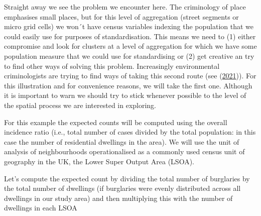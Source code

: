 \documentclass[
  krantz2]{krantz}
\makeatletter
\newenvironment{Shaded}{\begin{snugshade}}{\end{snugshade}}
\newcommand{\AttributeTok}[1]{\textcolor[rgb]{0.61,0.61,0.61}{#1}}
\newcommand{\CommentTok}[1]{\textcolor[rgb]{0.37,0.37,0.37}{\textit{#1}}}
\newcommand{\FunctionTok}[1]{\textcolor[rgb]{0,0,0}{#1}}
\newcommand{\NormalTok}[1]{#1}
\newcommand{\OtherTok}[1]{\textcolor[rgb]{0.37,0.37,0.37}{#1}}
\newcommand{\SpecialCharTok}[1]{\textcolor[rgb]{0,0,0}{#1}}
\newenvironment{kframe}{%
\medskip{}
\setlength{\fboxsep}{.8em}
 \def\at@end@of@kframe{}%
 \ifinner\ifhmode%
  \def\at@end@of@kframe{\end{minipage}}%
  \begin{minipage}{\columnwidth}%
 \fi\fi%
 \def\FrameCommand##1{\hskip\@totalleftmargin \hskip-\fboxsep
 \colorbox{shadecolor}{##1}\hskip-\fboxsep
     \hskip-\linewidth \hskip-\@totalleftmargin \hskip\columnwidth}%
 \MakeFramed {\advance\hsize-\width
   \@totalleftmargin\z@ \linewidth\hsize
   \@setminipage}}%
 {\par\unskip\endMakeFramed%
 \at@end@of@kframe}
\renewenvironment{Shaded}{\begin{kframe}}{\end{kframe}}
\makeatother
\begin{document}
Straight away we see the problem we encounter here. The criminology of place emphasises small places, but for this level of aggregation (street segments or micro grid cells) we won´t have census variables indexing the population that we could easily use for purposes of standardisation. This means we need to (1) either compromise and look for clusters at a level of aggregation for which we have some population measure that we could use for standardising or (2) get creative an try to find other ways of solving this problem. Increasingly environmental criminologists are trying to find ways of taking this second route (see (\protect\hyperlink{ref-Andresen_2021}{2021})). For this illustration and for convenience reasons, we will take the first one. Although it is important to warn we should try to stick whenever possible to the level of the spatial process we are interested in exploring.

For this example the expected counts will be computed using the overall incidence ratio (i.e., total number of cases divided by the total population: in this case the number of residential dwellings in the area). We will use the unit of analysis of neighbourhoods operationalised as a commonly used census unit of geography in the UK, the Lower Super Output Area (LSOA).

Let's compute the expected count by dividing the total number of burglaries by the total number of dwellings (if burglaries were evenly distributed across all dwellings in our study area) and then multiplying this with the number of dwellings in each LSOA

\begin{Shaded}
\end{Shaded}
\end{document}
